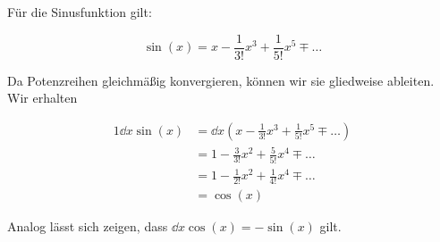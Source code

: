 \item Für die Sinusfunktion gilt:

$$
	\sin(x) = x - \frac{1}{3!}x^3 + \frac{1}{5!} x^5 \mp \dots
$$

Da Potenzreihen gleichmäßig konvergieren, können wir sie gliedweise ableiten. Wir erhalten

\begin{alignat*}{1}
	\dd{}{x} \sin(x) &= \dd{}{x} \left(x - \frac{1}{3!}x^3 + \frac{1}{5!} x^5 \mp \dots \right) \\
					 &= 1-\frac{3}{3!}x^2 + \frac{5}{5!} x^4 \mp \dots \\
					 &= 1-\frac{1}{2!}x^2 + \frac{1}{4!} x^4 \mp \dots \\
					 &= \cos(x)
\end{alignat*}

Analog lässt sich zeigen, dass $\dd{}{x} \cos(x) = -\sin(x)$ gilt.